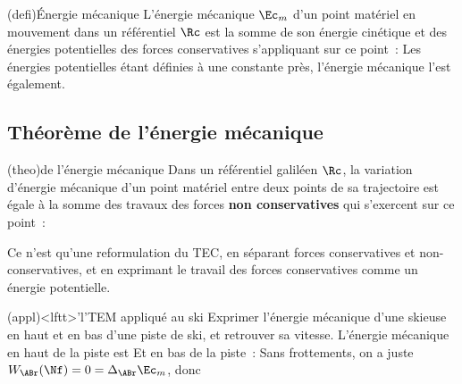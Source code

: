 \documentclass[../../main/main.tex]{subfiles}
\begin{document}
\begin{tcb*}(defi){Énergie mécanique}
	L'énergie mécanique $\Ec_m$ d'un point matériel en mouvement dans un
	référentiel $\Rc$ est la somme de son énergie cinétique et des énergies
	potentielles des forces conservatives s'appliquant sur ce point~:
	\psw{
		\[\boxed{\Ec_m = \Ec_c + \Ec_{p, \tot}}\]
	}
	Les énergies potentielles étant définies à une constante près, l'énergie
	mécanique l'est également.
\end{tcb*}

\subsection{Théorème de l'énergie mécanique}
\begin{tcb*}(theo){de l'énergie mécanique}
	Dans un référentiel galiléen $\Rc$, la variation d'énergie mécanique d'un
	point matériel entre deux points de sa trajectoire est égale à la somme des
	travaux des forces \textbf{non conservatives} qui s'exercent sur ce point~:
	\psw{
		\[
			\boxed{
				\D_{\ABr}\Ec_m\Rg =
				\Ec_m(\Br) - \Ec_m(\Ar) =
				\sum_i W_{\ABr} (\Ff_{{\rm NC},i})
			}
		\]
	}
	\vspace{-15pt}
\end{tcb*}

Ce n'est qu'une reformulation du TEC, en séparant forces conservatives et
non-conservatives, et en exprimant le travail des forces conservatives comme un
énergie potentielle.

\begin{tcb*}(appl)<lftt>'l'{TEM appliqué au ski}
	Exprimer l'énergie mécanique d'une skieuse en haut et en bas d'une piste de
	ski, et retrouver sa vitesse.
	\tcblower
	L'énergie mécanique en haut de la piste est
	\psw{\[\Ec_m(\Ar) = \frac{1}{2}mv_{\Ar}{}^2 + mgz_{\Ar} = 0 + mgh\]}
	Et en bas de la piste~:
	\psw{\[\Ec_m(\Br) = \frac{1}{2}mv_{\Br}{}^2 + mgz_{\Br} = \frac{1}{2}mv^2 + 0\]}
	Sans frottements, on a juste $W_{\ABr}(\Nf) = 0 = \Delta_{\ABr}\Ec_{m}$, donc
	\psw{\[\frac{1}{2}mv^2 = mgh\quad\Ra\quad\boxed{v=\sqrt{2gh}}\]}
	\vspace*{-15pt}
\end{tcb*}
\end{document}
